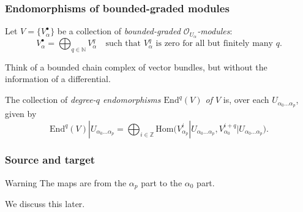 \documentclass{beamer}
\begin{document}
        \begin{frame}\frametitle{Endomorphisms of bounded-graded modules}
            Let $V=\{V_\alpha^\bullet\}$ be a collection of \emph{bounded-graded $\mathcal{O}_{U_\alpha}$-modules}:
            \begin{equation*}
                V_\alpha^\bullet = \bigoplus_{q\in\mathbb{N}}V_\alpha^q\quad\text{such that }V_\alpha^q\text{ is zero for all but finitely many }q.
            \end{equation*}

            \pause

            Think of a bounded chain complex of vector bundles, but without the information of a differential.

            \pause

            \begin{definition}[Endomorphisms]
                The collection of \emph{degree-$q$ endomorphisms $\mathrm{End}^q(V)$ of $V$} is, over each $U_{\alpha_0\ldots\alpha_p}$, given by
                \begin{equation*}
                    \mathrm{End}^q(V)|U_{\alpha_0\ldots\alpha_p} = \bigoplus_{i\in\mathbb{Z}}\mathrm{Hom}\big( V_{\alpha_p}^i|U_{\alpha_0\ldots\alpha_p}, V_{\alpha_0}^{i+q}|U_{\alpha_0\ldots\alpha_p} \big).
                \end{equation*}
            \end{definition}
        \end{frame}

        \begin{frame}\frametitle{Source and target}
            \begin{alertblock}{Warning}
                The maps are from the $\alpha_p$ part to the $\alpha_0$ part.
            \end{alertblock}

            \pause

            We discuss this later.
        \end{frame}
\end{document}
